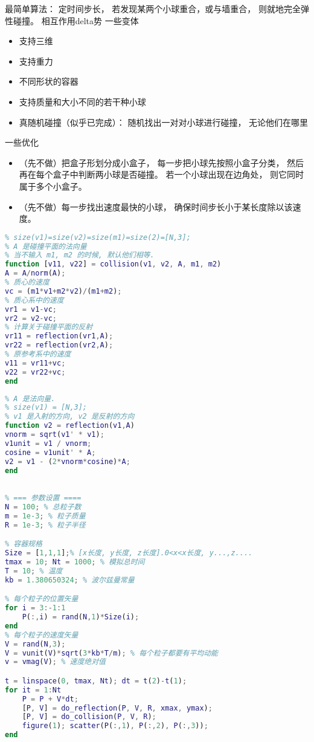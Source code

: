 
\begin{issues}
\issueDraft
\end{issues}


最简单算法： 定时间步长， 若发现某两个小球重合，或与墙重合， 则就地完全弹性碰撞。
相互作用delta势
一些变体
\begin{itemize}
\item 支持三维
\item 支持重力
\item 不同形状的容器
\item 支持质量和大小不同的若干种小球
\item 真随机碰撞（似乎已完成）： 随机找出一对对小球进行碰撞， 无论他们在哪里
\end{itemize}

一些优化
\begin{itemize}
\item （先不做）把盒子形划分成小盒子， 每一步把小球先按照小盒子分类， 然后再在每个盒子中判断两小球是否碰撞。 若一个小球出现在边角处， 则它同时属于多个小盒子。
\item （先不做）每一步找出速度最快的小球， 确保时间步长小于某长度除以该速度。
\end{itemize}

\begin{lstlisting}[language=matlab]
% 两个粒子的完全弹性碰撞
% size(v1)=size(v2)=size(m1)=size(2)=[N,3];
% A 是碰撞平面的法向量
% 当不输入 m1, m2 的时候, 默认他们相等.
function [v11, v22] = collision(v1, v2, A, m1, m2)
A = A/norm(A);
% 质心的速度
vc = (m1*v1+m2*v2)/(m1+m2);
% 质心系中的速度
vr1 = v1-vc;
vr2 = v2-vc;
% 计算关于碰撞平面的反射
vr11 = reflection(vr1,A);
vr22 = reflection(vr2,A);
% 原参考系中的速度
v11 = vr11+vc;
v22 = vr22+vc;
end
\end{lstlisting}

\begin{lstlisting}[language=matlab]
% 反射
% A 是法向量. 
% size(v1) = [N,3];
% v1 是入射的方向, v2 是反射的方向
function v2 = reflection(v1,A)
vnorm = sqrt(v1' * v1);
v1unit = v1 / vnorm;
cosine = v1unit' * A;
v2 = v1 - (2*vnorm*cosine)*A;
end
\end{lstlisting}

\begin{lstlisting}[language=matlab]
%麦克斯韦-波尔兹曼分布

% === 参数设置 ====
N = 100; % 总粒子数
m = 1e-3; % 粒子质量
R = 1e-3; % 粒子半径

% 容器规格
Size = [1,1,1];% [x长度, y长度, z长度].0<x<x长度, y...,z....
tmax = 10; Nt = 1000; % 模拟总时间
T = 10; % 温度
kb = 1.380650324; % 波尔兹曼常量

% 每个粒子的位置矢量
for i = 3:-1:1
    P(:,i) = rand(N,1)*Size(i);
end
% 每个粒子的速度矢量
V = rand(N,3);
V = vunit(V)*sqrt(3*kb*T/m); % 每个粒子都要有平均动能
v = vmag(V); % 速度绝对值

t = linspace(0, tmax, Nt); dt = t(2)-t(1);
for it = 1:Nt
    P = P + V*dt;
    [P, V] = do_reflection(P, V, R, xmax, ymax);
    [P, V] = do_collision(P, V, R);
    figure(1); scatter(P(:,1), P(:,2), P(:,3));
end
\end{lstlisting}

